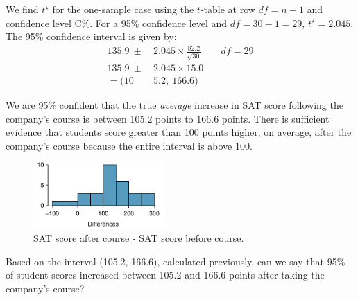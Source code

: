 \begin{examplewrap}
\begin{nexample}
\begin{description}
We find $t^{\star}$ for the one-sample case using the $t$-table at row $df = n -1$ and confidence level C\%.  For a 95\% confidence level and $df = 30 - 1 = 29$, $t^{\star} = 2.045$.\\

The 95\% confidence interval is given by:
\begin{align*}
135.9 \ \pm\  &2.045\times  \frac{82.2}{\sqrt{30}}  \qquad df = 29\\
135.9 \ \pm\  &2.045\times 15.0 \\
=(10&5.2,\ 166.6)
\end{align*}
\item[\inferencestep{Conclude}]  We are 95\% confident that the true \emph{average} increase in SAT score following the company's course is between 105.2 points to 166.6 points.  There is sufficient evidence that students score greater than 100 points higher, on average, after the company's course because the entire interval is above 100.  
\end{description}
\end{nexample}
\end{examplewrap}


\begin{figure}
\centering
\includegraphics[width=0.45\textwidth]{ch_inference_for_means/figures/satImprovementHTDataHistogram/satImprovementHTDataHistogram}
\caption{SAT score after course - SAT score before course. }
\label{satImprovementHTDataHistogram3}
\end{figure}


\begin{exercisewrap}
\begin{nexercise}
Based on the interval (105.2, 166.6), calculated previously, can we say that 95\% of student scores increased between 105.2 and 166.6 points after taking the company's course?\footnotemark{}
\end{nexercise}
\end{exercisewrap}

